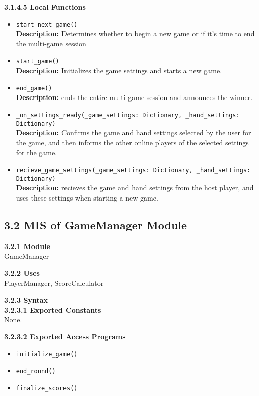 \documentclass[12pt, titlepage]{article}
\begin{document}
\textbf{3.1.4.5 Local Functions}
\begin{itemize}
    \item \texttt{start\_next\_game()}\\
	\textbf{Description:} Determines whether to begin a new game or if it's time to end the multi-game session 
    
    \item \texttt{start\_game()}\\
    \textbf{Description:} Initializes the game settings and starts a new game.
    
    \item \texttt{end\_game()}\\
    \textbf{Description:} ends the entire multi-game session and announces the winner.
    
    \item \texttt{\_on\_settings\_ready(\_game\_settings: Dictionary, \_hand\_settings: Dictionary)}\\
    \textbf{Description:} Confirms the game and hand settings selected by the user for the game, and then informs the other online players of the selected settings for the game.
    
    \item \texttt{recieve\_game\_settings(\_game\_settings: Dictionary, \_hand\_settings: Dictionary)}\\
    \textbf{Description:} recieves the game and hand settings from the host player, and uses these settings when starting a new game.
    
\end{itemize}

\subsection*{3.2 MIS of GameManager Module}
\textbf{3.2.1 Module}\\
GameManager

\textbf{3.2.2 Uses}\\
PlayerManager, ScoreCalculator

\textbf{3.2.3 Syntax}\\
\textbf{3.2.3.1 Exported Constants}\\
None.  

\textbf{3.2.3.2 Exported Access Programs}
\begin{itemize}
    \item \texttt{initialize\_game()}
    \item \texttt{end\_round()}
    \item \texttt{finalize\_scores()}
\end{itemize}
\end{document}
